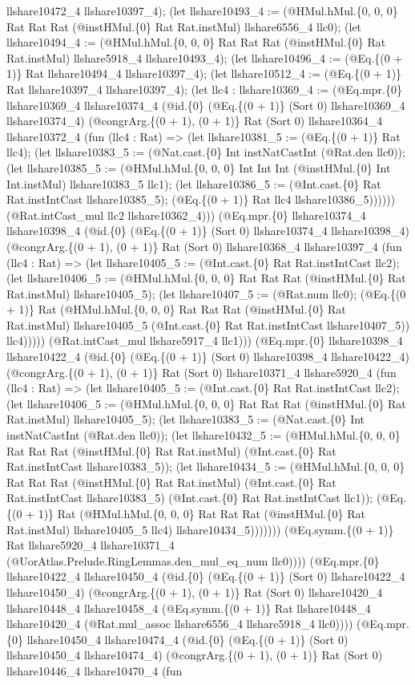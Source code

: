 \documentclass[11pt]{article}
\begin{document}
llshare10472\_4 llshare10397\_4); (let llshare10493\_4 := (@HMul.hMul.\{0, 0, 0\} Rat Rat Rat (@instHMul.\{0\} Rat Rat.instMul) llshare6556\_4 llc0); (let llshare10494\_4 := (@HMul.hMul.\{0, 0, 0\} Rat Rat Rat (@instHMul.\{0\} Rat Rat.instMul) llshare5918\_4 llshare10493\_4); (let llshare10496\_4 := (@Eq.\{(0 + 1)\} Rat llshare10494\_4 llshare10397\_4); (let llshare10512\_4 := (@Eq.\{(0 + 1)\} Rat llshare10397\_4 llshare10397\_4); (let llc4 : llshare10369\_4 := (@Eq.mpr.\{0\} llshare10369\_4 llshare10374\_4 (@id.\{0\} (@Eq.\{(0 + 1)\} (Sort 0) llshare10369\_4 llshare10374\_4) (@congrArg.\{(0 + 1), (0 + 1)\} Rat (Sort 0) llshare10364\_4 llshare10372\_4 (fun (llc4 : Rat) => (let llshare10381\_5 := (@Eq.\{(0 + 1)\} Rat llc4); (let llshare10383\_5 := (@Nat.cast.\{0\} Int instNatCastInt (@Rat.den llc0)); (let llshare10385\_5 := (@HMul.hMul.\{0, 0, 0\} Int Int Int (@instHMul.\{0\} Int Int.instMul) llshare10383\_5 llc1); (let llshare10386\_5 := (@Int.cast.\{0\} Rat Rat.instIntCast llshare10385\_5); (@Eq.\{(0 + 1)\} Rat llc4 llshare10386\_5)))))) (@Rat.intCast\_mul llc2 llshare10362\_4))) (@Eq.mpr.\{0\} llshare10374\_4 llshare10398\_4 (@id.\{0\} (@Eq.\{(0 + 1)\} (Sort 0) llshare10374\_4 llshare10398\_4) (@congrArg.\{(0 + 1), (0 + 1)\} Rat (Sort 0) llshare10368\_4 llshare10397\_4 (fun (llc4 : Rat) => (let llshare10405\_5 := (@Int.cast.\{0\} Rat Rat.instIntCast llc2); (let llshare10406\_5 := (@HMul.hMul.\{0, 0, 0\} Rat Rat Rat (@instHMul.\{0\} Rat Rat.instMul) llshare10405\_5); (let llshare10407\_5 := (@Rat.num llc0); (@Eq.\{(0 + 1)\} Rat (@HMul.hMul.\{0, 0, 0\} Rat Rat Rat (@instHMul.\{0\} Rat Rat.instMul) llshare10405\_5 (@Int.cast.\{0\} Rat Rat.instIntCast llshare10407\_5)) llc4))))) (@Rat.intCast\_mul llshare5917\_4 llc1))) (@Eq.mpr.\{0\} llshare10398\_4 llshare10422\_4 (@id.\{0\} (@Eq.\{(0 + 1)\} (Sort 0) llshare10398\_4 llshare10422\_4) (@congrArg.\{(0 + 1), (0 + 1)\} Rat (Sort 0) llshare10371\_4 llshare5920\_4 (fun (llc4 : Rat) => (let llshare10405\_5 := (@Int.cast.\{0\} Rat Rat.instIntCast llc2); (let llshare10406\_5 := (@HMul.hMul.\{0, 0, 0\} Rat Rat Rat (@instHMul.\{0\} Rat Rat.instMul) llshare10405\_5); (let llshare10383\_5 := (@Nat.cast.\{0\} Int instNatCastInt (@Rat.den llc0)); (let llshare10432\_5 := (@HMul.hMul.\{0, 0, 0\} Rat Rat Rat (@instHMul.\{0\} Rat Rat.instMul) (@Int.cast.\{0\} Rat Rat.instIntCast llshare10383\_5)); (let llshare10434\_5 := (@HMul.hMul.\{0, 0, 0\} Rat Rat Rat (@instHMul.\{0\} Rat Rat.instMul) (@Int.cast.\{0\} Rat Rat.instIntCast llshare10383\_5) (@Int.cast.\{0\} Rat Rat.instIntCast llc1)); (@Eq.\{(0 + 1)\} Rat (@HMul.hMul.\{0, 0, 0\} Rat Rat Rat (@instHMul.\{0\} Rat Rat.instMul) llshare10405\_5 llc4) llshare10434\_5))))))) (@Eq.symm.\{(0 + 1)\} Rat llshare5920\_4 llshare10371\_4 (@UorAtlas.Prelude.RingLemmas.den\_mul\_eq\_num llc0)))) (@Eq.mpr.\{0\} llshare10422\_4 llshare10450\_4 (@id.\{0\} (@Eq.\{(0 + 1)\} (Sort 0) llshare10422\_4 llshare10450\_4) (@congrArg.\{(0 + 1), (0 + 1)\} Rat (Sort 0) llshare10420\_4 llshare10448\_4 llshare10458\_4 (@Eq.symm.\{(0 + 1)\} Rat llshare10448\_4 llshare10420\_4 (@Rat.mul\_assoc llshare6556\_4 llshare5918\_4 llc0)))) (@Eq.mpr.\{0\} llshare10450\_4 llshare10474\_4 (@id.\{0\} (@Eq.\{(0 + 1)\} (Sort 0) llshare10450\_4 llshare10474\_4) (@congrArg.\{(0 + 1), (0 + 1)\} Rat (Sort 0) llshare10446\_4 llshare10470\_4 (fun 
\end{document}

